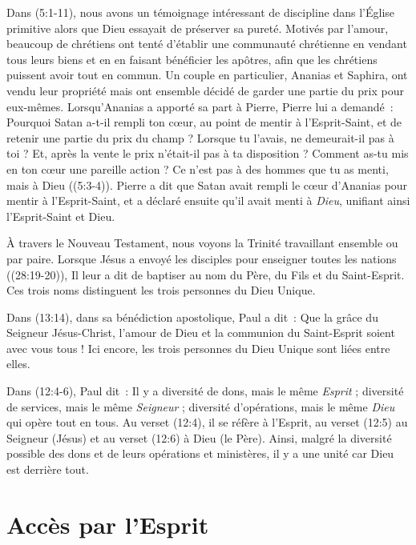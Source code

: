 Dans (5:1-11), nous avons un témoignage intéressant de
 discipline dans l'Église primitive alors que Dieu essayait de préserver
 sa pureté.
 Motivés par l'amour, beaucoup de chrétiens ont tenté d'établir une
 communauté chrétienne en vendant tous leurs biens et en en faisant
 bénéficier les apôtres, afin que les chrétiens puissent avoir tout en
 commun. Un couple en particulier, Ananias et Saphira, ont vendu leur
 propriété mais ont ensemble décidé de garder une partie du prix pour
 eux-mêmes. Lorsqu'Ananias a apporté sa part à Pierre, Pierre lui a
 demandé~: \og Pourquoi Satan a-t-il rempli ton cœur, au point de mentir
 à l'Esprit-Saint, et de retenir une partie du prix du champ ? Lorsque tu
 l'avais, ne demeurait-il pas à toi ? Et, après la vente le prix n'était-il
 pas à ta disposition ?
 Comment as-tu mis en ton cœur une pareille action ?
 Ce n'est pas à des hommes que tu as menti, mais à Dieu \fg{}
 ((5:3-4)).
 Pierre a dit que Satan avait rempli le cœur d'Ananias pour mentir
 à l'Esprit-Saint, et a déclaré ensuite qu'il avait menti à \emph{Dieu}, unifiant
 ainsi l'Esprit-Saint et Dieu.

À travers le Nouveau Testament, nous voyons la Trinité travaillant ensemble
 ou par paire. Lorsque Jésus a envoyé les disciples pour enseigner toutes
 les nations ((28:19-20)), Il leur a dit de baptiser au nom
 du Père, du Fils et du Saint-Esprit. Ces trois noms distinguent les trois
 personnes du Dieu Unique.

Dans (13:14), dans sa bénédiction apostolique, Paul a dit~:
 \og Que la grâce du Seigneur Jésus-Christ, l'amour de Dieu et la communion
 du Saint-Esprit soient avec vous tous ! \fg{}
 Ici encore, les trois personnes du Dieu Unique sont liées entre elles.

Dans (12:4-6), Paul dit~:
 \og Il y a diversité de dons, mais le même \emph{Esprit} ; diversité de services,
 mais le même \emph{Seigneur} ; diversité d'opérations, mais le
 même \emph{Dieu} qui opère tout en tous. \fg{}
 Au verset (12:4), il se réfère à l'Esprit,
 au verset (12:5) au Seigneur (Jésus)
 et au verset (12:6) à Dieu (le Père).
 Ainsi, malgré la diversité possible des dons et de leurs opérations
 et ministères, il y a une unité car Dieu est derrière tout.


\section*{Accès par l'Esprit}

